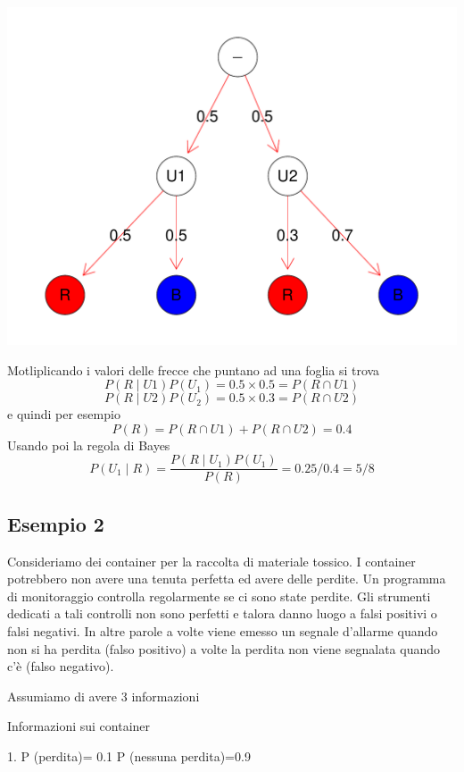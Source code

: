 \documentclass[onecolumn,12pt]{book}\usepackage[]{graphicx}\usepackage[]{color}
\makeatletter
\def\maxwidth{ %
  \ifdim\Gin@nat@width>\linewidth
    \linewidth
  \else
    \Gin@nat@width
  \fi
}
\newenvironment{knitrout}{}{} %
\makeatother
\begin{document}
\begin{knitrout}
\color{fgcolor}
\includegraphics[width=\maxwidth]{figure/unnamed-chunk-18-1} 

\end{knitrout}

Motliplicando i valori delle frecce che puntano ad una foglia si trova
$$P(R\mid U1)P(U_1)=0.5\times 0.5=P(R\cap U1)$$
$$P(R\mid U2)P(U_2)=0.5\times 0.3=P(R\cap U2)$$
e quindi per esempio
$$P(R)=P(R\cap U1)+P(R\cap U2)=0.4$$
Usando poi la regola di Bayes
$$P(U_1\mid R)=\dfrac{P(R\mid U_1)P(U_1)}{P(R)}=0.25/0.4=5/8$$


\subsection{Esempio 2}

Consideriamo dei container per la raccolta di materiale tossico. I container potrebbero non avere una tenuta perfetta ed avere delle perdite. Un programma di monitoraggio  controlla regolarmente se ci sono state perdite. Gli strumenti dedicati a tali controlli non sono perfetti e talora danno luogo a falsi positivi o falsi negativi.  In altre parole a volte viene emesso un segnale d'allarme quando non si ha perdita (falso positivo) a volte la perdita non viene segnalata quando c'è (falso negativo).

Assumiamo di avere 3 informazioni

Informazioni sui container

1.   P (perdita)= 0.1    
     P (nessuna perdita)=0.9
\end{document}
